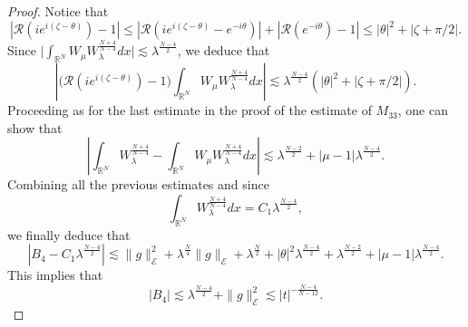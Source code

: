\documentclass[a4paper,two-side,10pt]{amsart}
\newcommand{\R}{\mathbb{R}}
\numberwithin{equation}{section}
\begin{document}
\begin{proof}
Notice that
$$|\mathcal{R} (ie^{i (\zeta -\theta)}) -1|\leq |\mathcal{R}(i e^{i (\zeta - \theta)} -e^{-i\theta} )| +|\mathcal{R} (e^{-i\theta}) -1| \leq  |\theta|^2 + |\zeta +\pi/2|.$$
Since $\big|\int_{\R^N} W_\mu W_\lambda^{\frac{N+4}{N-4}} dx\big|\lesssim \lambda^{\frac{N-4}{2}}$, we deduce that
$$ \left| \big(\mathcal{R} (ie^{i (\zeta -\theta)})  -1\big) \int_{\R^N} W_\mu W_\lambda^{\frac{N+4}{N-4}}dx \right|\lesssim \lambda^{\frac{N-4}{2}} (|\theta|^2 + |\zeta+\pi/2|). $$
Proceeding as for the last estimate in the proof of the estimate of $M_{33}$, one can show that
$$\left|\int_{\R^N} W_\lambda^{\frac{N+4}{N-4}} -\int_{\R^N} W_\mu W_\lambda^{\frac{N+4}{N-4}} dx\right| \lesssim \lambda^{\frac{N-2}{2}} + |\mu -1| \lambda^{\frac{N-4}{2}}.$$
Combining all the previous estimates and since 
$$\int_{\R^N} W_\lambda^{\frac{N+4}{N-4}} dx =C_1 \lambda^{\frac{N-4}{2}},$$
we finally deduce that
$$|B_4 - C_1 \lambda^{\frac{N-4}{2}}|\lesssim \|g\|^2_{\mathcal{E}} + \lambda^{\frac{N}{4}} \|g\|_{\mathcal{E}}+ \lambda^{\frac{N}{2}}+ |\theta|^2 \lambda^{\frac{N-4}{2}}+\lambda^{\frac{N-2}{2}} + |\mu -1| \lambda^{\frac{N-4}{2}}. $$
This implies that
$$|B_4|\lesssim \lambda^{\frac{N-4}{2}}+\|g\|^2_{\mathcal{E}}
\lesssim  |t|^{-\frac{N-4}{N-12}}.
$$



\end{proof}
\end{document}
